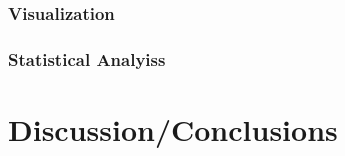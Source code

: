 \documentclass[
]{book}
\begin{document}
\hypertarget{visualization}{%
\subsubsection{Visualization}\label{visualization}}

\hypertarget{statistical-analyiss}{%
\subsubsection{Statistical Analyiss}\label{statistical-analyiss}}

\hypertarget{discussionconclusions}{%
\section{Discussion/Conclusions}\label{discussionconclusions}}

  
\end{document}

